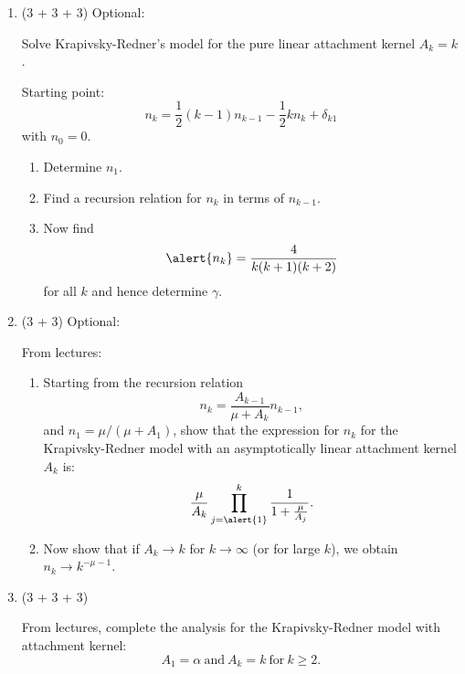 \begin{enumerate}
  
   \solutionstart


   \solutionend


\item (3 + 3 + 3) Optional:

  Solve Krapivsky-Redner's model for the pure linear attachment
  kernel $A_{k}=k$. 

  Starting point:
  $$
  n_{k}
  =
  \frac{1}{2}
  (k-1) n_{k-1} 
  - 
  \frac{1}{2}
  k n_{k}
  + \delta_{k1}
  $$
  with $n_{0}=0$.

  \begin{enumerate}
  \item 
    Determine $n_{1}$.
  \item 
    Find a recursion relation for $n_{k}$ in terms
    of $n_{k-1}$.
  \item 
    Now find
    $$
    \alert{n_{k}} 
    = 
    \frac{4}{k(k+1)(k+2)}
    $$
    for all $k$ and
    hence determine $\gamma$.
  \end{enumerate}

  
   \solutionstart


   \solutionend

\item (3 + 3) Optional:

  From lectures:

  \begin{enumerate}
  \item 
    Starting from the recursion relation
    $$
    n_{k}
    =
    \frac{A_{k-1}}{\mu + A_{k}}
    n_{k-1},
    $$
    and $n_{1} = \mu/(\mu+A_{1})$,
    show that the expression for $n_{k}$ for
    the Krapivsky-Redner model with an asymptotically linear
    attachment kernel $A_{k}$ is:
    $$
    \frac{\mu}{A_{k}}
    \prod_{j=\alert{1}}^{k}
    \frac{1}{1 + \frac{\mu}{A_{j}}}.
    $$
  \item 
    Now show that if $A_{k} \rightarrow k$ for
    $k \rightarrow \infty$ (or for large $k$), we obtain
    $n_{k} \rightarrow k^{-\mu-1}$.
  \end{enumerate}

  
   \solutionstart


   \solutionend


  

\item (3 + 3 + 3)

  From lectures, complete the analysis for the Krapivsky-Redner model
  with attachment kernel:
  $$
  A_{1} = \alpha 
  \
  \mbox{and} 
  \
  A_{k} = k
  \
  \mbox{for} 
  \
  k \ge 2.
  $$


\end{enumerate}
